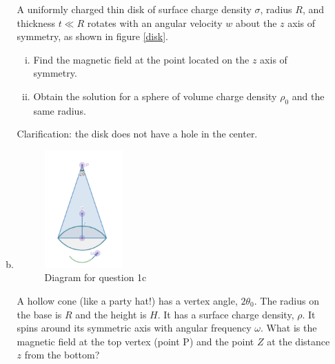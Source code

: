 \documentclass[12pt,geometry,width=8in]{article}
\begin{document}
\begin{enumerate}[(1),topsep=0pt,itemsep=0ex,partopsep=1ex,parsep=1ex]
\begin{enumerate}[(a)]
A uniformly charged thin disk of surface charge density $\sigma$, radius $R$, and thickness $t \ll R$ rotates with an angular velocity $w$ about the $z$ axis of symmetry, as shown in figure \ref{disk}.

\begin{enumerate}[(i)]
\item Find the magnetic field at the point located on the $z$ axis of symmetry.
\item Obtain the solution for a sphere of volume charge density $\rho_0$ and the same radius.
\end{enumerate}

Clarification: the disk does not have a hole in the center.

\newpage
\item

\begin{figure}[h]
    \centering
    \includegraphics[width=0.3\textwidth]{cone}
    \caption{Diagram for question 1c}
    \label{cone}
\end{figure}

A hollow cone (like a party hat!) has a vertex angle, $2\theta_0$. The radius on the base is $R$ and the height is $H$. It has a surface charge density, $\rho$. It spins around its symmetric axis with angular frequency $\omega$. What is the magnetic field at the top vertex (point P) and the point $Z$ at the distance $z$ from the bottom?
\end{enumerate}

\newpage


\end{enumerate}
\end{document}
